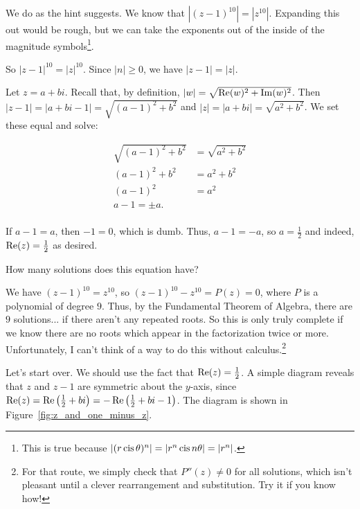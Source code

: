 \documentclass[../key.tex]{subfiles}
\begin{document}
We do as the hint suggests. We know that $|(z-1)^{10}|=|z^{10}|$. Expanding this out would be rough, but we can take the exponents out of the inside of the magnitude symbols\footnote{This is true because $|(r\operatorname{cis} \theta)^n|=|r^n\operatorname{cis} n\theta| = |r^n|$.}.

So $|z-1|^{10}=|z|^{10}$. Since $|n|\geq 0$, we have $|z-1|=|z|$.

Let $z=a+bi$. Recall that, by definition, $|w| = \sqrt{\operatorname{Re}(w)^2 + \operatorname{Im}(w)^2}$. Then $|z-1|=|a+bi-1|=\sqrt{(a-1)^2+b^2}$ and $|z|=|a+bi|=\sqrt{a^2+b^2}$. We set these equal and solve:

\begin{align*}
\sqrt{(a-1)^2+b^2} &= \sqrt{a^2+b^2} \\
(a-1)^2 + b^2 &= a^2 + b^2 \\
(a-1)^2 &= a^2 \\
a-1 = \pm a. \\
\end{align*}

If $a-1=a$, then $-1=0$, which is dumb. Thus, $a-1=-a$, so $a=\frac{1}{2}$ and indeed, $\operatorname{Re}(z) = \frac{1}{2}$ as desired.

\begin{inner_problem}
\item How many solutions does this equation have?
\end{inner_problem}

We have $(z-1)^{10}=z^{10}$, so $(z-1)^{10}-z^{10} = P(z) = 0$, where $P$ is a polynomial of degree $9$. Thus, by the Fundamental Theorem of Algebra, there are $9$ solutions... if there aren't any repeated roots. So this is only truly complete if we know there are no roots which appear in the factorization twice or more. Unfortunately, I can't think of a way to do this without calculus.\footnote{For that route, we simply check that $P''(z)\neq 0$ for all solutions, which isn't pleasant until a clever rearrangement and substitution. Try it if you know how!}

Let's start over. We should use the fact that $\operatorname{Re}(z)=\frac{1}{2}$. A simple diagram reveals that $z$ and $z-1$ are symmetric about the $y$-axis, since $\operatorname{Re}(z) = \operatorname{Re}\left(\frac{1}{2}+bi\right) = -\operatorname{Re}\left(\frac{1}{2}+bi-1\right)$. The diagram is shown in Figure~\ref{fig:z_and_one_minus_z}.
\end{document}
